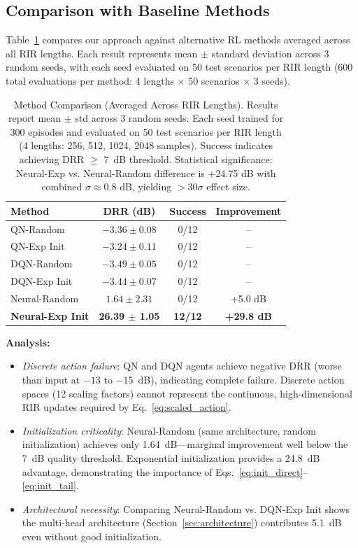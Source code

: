 \documentclass[12pt,a4paper]{article}
\begin{document}
\subsection{Comparison with Baseline Methods}

Table~\ref{tab:baselines} compares our approach against alternative RL methods averaged across all RIR lengths. Each result represents mean $\pm$ standard deviation across 3 random seeds, with each seed evaluated on 50 test scenarios per RIR length (600 total evaluations per method: 4 lengths $\times$ 50 scenarios $\times$ 3 seeds).

\begin{table}[t]
\centering
\caption{Method Comparison (Averaged Across RIR Lengths). Results report mean $\pm$ std across 3 random seeds. Each seed trained for 300 episodes and evaluated on 50 test scenarios per RIR length (4 lengths: 256, 512, 1024, 2048 samples). Success indicates achieving DRR $\geq$ 7~dB threshold. Statistical significance: Neural-Exp vs. Neural-Random difference is +24.75 dB with combined $\sigma \approx 0.8$ dB, yielding $>$30$\sigma$ effect size.}
\label{tab:baselines}
\small
\begin{tabular}{@{}lccc@{}}
\toprule
\textbf{Method} & \textbf{DRR (dB)} & \textbf{Success} & \textbf{Improvement} \\
\midrule
QN-Random & $-3.36 \pm 0.08$ & 0/12 & -- \\
QN-Exp Init & $-3.24 \pm 0.11$ & 0/12 & -- \\
DQN-Random & $-3.49 \pm 0.05$ & 0/12 & -- \\
DQN-Exp Init & $-3.44 \pm 0.07$ & 0/12 & -- \\
Neural-Random & $1.64 \pm 2.31$ & 0/12 & +5.0 dB \\
\textbf{Neural-Exp Init} & \textbf{26.39 $\pm$ 1.05} & \textbf{12/12} & \textbf{+29.8 dB} \\
\bottomrule
\end{tabular}
\end{table}

\textbf{Analysis:}
\begin{itemize}
\item \textit{Discrete action failure}: QN and DQN agents achieve negative DRR (worse than input at $-13$ to $-15$~dB), indicating complete failure. Discrete action spaces (12 scaling factors) cannot represent the continuous, high-dimensional RIR updates required by Eq.~\eqref{eq:scaled_action}.
\item \textit{Initialization criticality}: Neural-Random (same architecture, random initialization) achieves only 1.64~dB---marginal improvement well below the 7~dB quality threshold. Exponential initialization provides a 24.8~dB advantage, demonstrating the importance of Eqs.~\eqref{eq:init_direct}--\eqref{eq:init_tail}.
\item \textit{Architectural necessity}: Comparing Neural-Random vs. DQN-Exp Init shows the multi-head architecture (Section~\ref{sec:architecture}) contributes 5.1~dB even without good initialization.
\end{itemize}
\end{document}
